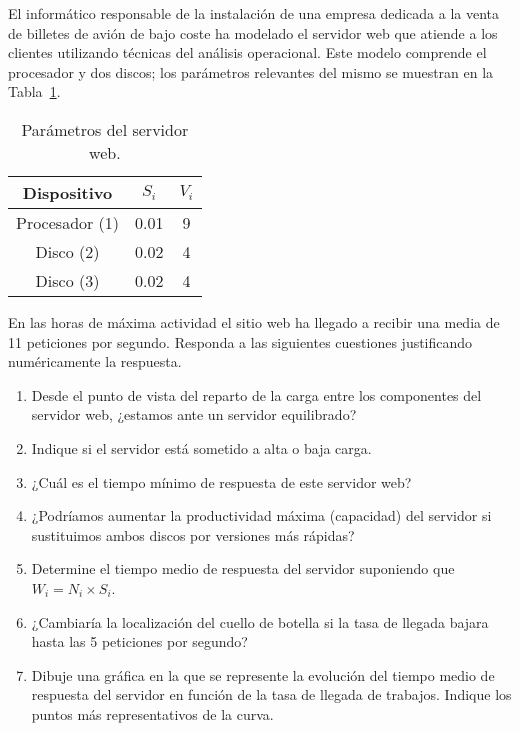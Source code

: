 \begin{ejercicio}\label{ej:5.22}
    El informático responsable de la instalación de una empresa dedicada a la venta de billetes de avión de bajo coste ha modelado el servidor web que atiende a los clientes utilizando técnicas del análisis operacional. Este modelo comprende el procesador y dos discos; los parámetros relevantes del mismo se muestran en la Tabla~\ref{tab:5.22}.
    \begin{table}[h]
        \centering
        \begin{tabular}{|c|c|c|}
            \hline
            Dispositivo & $S_i$ & $V_i$ \\
            \hline
            Procesador (1) & 0.01 & 9 \\
            Disco (2) & 0.02 & 4 \\
            Disco (3) & 0.02 & 4 \\
            \hline
        \end{tabular}
        \caption{Parámetros del servidor web.}
        \label{tab:5.22}
    \end{table}
    En las horas de máxima actividad el sitio web ha llegado a recibir una media de 11 peticiones por segundo. Responda a las siguientes cuestiones justificando numéricamente la respuesta.
    \begin{enumerate}
        \item Desde el punto de vista del reparto de la carga entre los componentes del servidor web, ¿estamos ante un servidor equilibrado?
        \item Indique si el servidor está sometido a alta o baja carga.
        \item ¿Cuál es el tiempo mínimo de respuesta de este servidor web?
        \item ¿Podríamos aumentar la productividad máxima (capacidad) del servidor si sustituimos ambos discos por versiones más rápidas?
        \item Determine el tiempo medio de respuesta del servidor suponiendo que $W_i = N_i \times S_i$.
        \item ¿Cambiaría la localización del cuello de botella si la tasa de llegada bajara hasta las 5 peticiones por segundo?
        \item Dibuje una gráfica en la que se represente la evolución del tiempo medio de respuesta del servidor en función de la tasa de llegada de trabajos. Indique los puntos más representativos de la curva.
    \end{enumerate}
\end{ejercicio}
